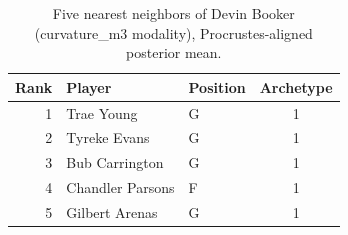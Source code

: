 \begin{table}[htbp]
  \centering\small
  \begin{tabular}{rllc}
    \toprule
    Rank & Player & Position & Archetype \\
    \midrule
    1 & Trae Young & G & 1 \\
    2 & Tyreke Evans & G & 1 \\
    3 & Bub Carrington & G & 1 \\
    4 & Chandler Parsons & F & 1 \\
    5 & Gilbert Arenas & G & 1 \\
    \bottomrule
  \end{tabular}
  \caption{Five nearest neighbors of Devin Booker (curvature_m3 modality), Procrustes-aligned posterior mean.}
  \label{tab:Devin_Booker_neighbors_curvature_m3}
\end{table}

